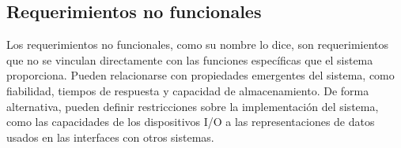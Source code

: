	
	\subsection{Requerimientos no funcionales}
	
	Los requerimientos no funcionales, como su nombre lo dice, son requerimientos que no se vinculan directamente con las funciones específicas que el sistema proporciona. Pueden relacionarse con propiedades emergentes del sistema, como fiabilidad, tiempos de respuesta y capacidad de almacenamiento. De forma alternativa, pueden definir restricciones sobre la implementación del sistema, como las capacidades de los dispositivos I/O a las representaciones de datos usados en las interfaces con otros sistemas. 
	
